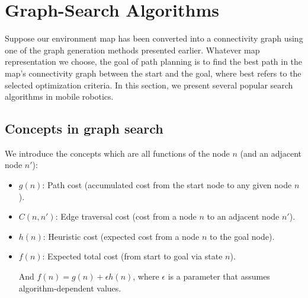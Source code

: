 \documentclass[twoside]{article}
\begin{document}
\section{Graph-Search Algorithms} \label{Graph-Search Algorithms}
Suppose our environment map has been converted into a connectivity graph using one of the graph generation methods presented earlier. Whatever map representation we choose, the goal of path planning is to find the best path in the map’s connectivity graph between the start and the goal, where best refers to the selected optimization criteria. In this section, we present several popular search algorithms in mobile robotics.

\subsection{Concepts in graph search}
We introduce the concepts which are all functions of the node $n$ (and an adjacent node $n'$):
\begin{itemize}
    \item $g(n)$: Path cost (accumulated cost from the start node to any given node $n$).
    
    \item $C(n, n')$: Edge traversal cost (cost from a node $n$ to an adjacent node $n'$).
    
    \item $h(n)$: Heuristic cost (expected cost from a node $n$ to the goal node).
    
    \item$f(n)$: Expected total cost (from start to goal via state $n$).

And $f(n) = g(n) + \epsilon h(n)$, where $\epsilon$ is a parameter that assumes algorithm-dependent values.
\end{itemize}
\end{document}
